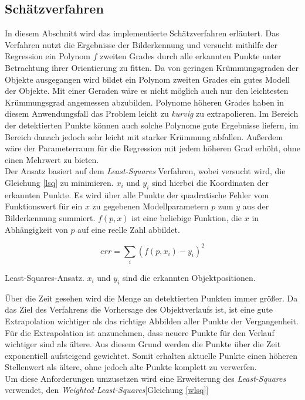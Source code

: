 \subsection{Schätzverfahren}
\label{sec_curveFit}
In diesem Abschnitt wird das implementierte Schätzverfahren erläutert. Das Verfahren nutzt die Ergebnisse der Bilderkennung und versucht mithilfe der Regression ein Polynom $f$ zweiten Grades durch alle erkannten Punkte unter Betrachtung ihrer Orientierung zu fitten. Da von geringen Krümmungsgraden der Objekte ausgegangen wird bildet ein Polynom zweiten Grades ein gutes Modell der Objekte. Mit einer Geraden wäre es nicht möglich auch nur den leichtesten Krümmungsgrad angemessen abzubilden. Polynome höheren Grades haben in diesem Anwendungsfall das Problem leicht zu \textit{kurvig} zu extrapolieren. Im Bereich der detektierten Punkte können auch solche Polynome gute Ergebnisse liefern, im Bereich danach jedoch sehr leicht mit starker Krümmung abfallen. Außerdem wäre der Parameterraum für die Regression mit jedem höheren Grad erhöht, ohne einen Mehrwert zu bieten.\\
Der Ansatz basiert auf dem \textit{Least-Squares} Verfahren\cite{simon2006optimal}, wobei versucht wird, die Gleichung \ref{lsq} zu minimieren.
$x_i$ und $y_i$ sind hierbei die Koordinaten der erkannten Punkte. Es wird über alle Punkte der quadratische Fehler vom Funktionswert für ein $x$ zu gegebenen Modellparametern $p$ zum $y$ aus der Bilderkennung summiert. $f(p,x)$ ist eine beliebige Funktion, die $x$ in Abhängigkeit von $p$ auf eine reelle Zahl abbildet.\\
\begin{ownequation}[H]
\begin{equation}
err = \sum_{i}(f(p,x_i)-y_i)^2
\end{equation}
\caption[Least-Squares-Ansatz]{Least-Squares-Ansatz. $x_i$ und $y_i$ sind die erkannten Objektpositionen.}
\label{lsq}
\end{ownequation}
Über die Zeit gesehen wird die Menge an detektierten Punkten immer größer. Da das Ziel des Verfahrens die Vorhersage des Objektverlaufs ist, ist eine gute Extrapolation wichtiger als das richtige Abbilden aller Punkte der Vergangenheit. Für die Extrapolation ist anzunehmen, dass neuere Punkte für den Verlauf wichtiger sind als ältere. Aus diesem Grund werden die Punkte über die Zeit exponentiell aufsteigend gewichtet. Somit erhalten aktuelle Punkte einen höheren Stellenwert als ältere, ohne jedoch alte Punkte komplett zu verwerfen.\\
Um diese Anforderungen umzusetzen wird eine Erweiterung des \textit{Least-Squares} verwendet, den \textit{Weighted-Least-Squares}[Gleichung \ref{wlsq}]\\

